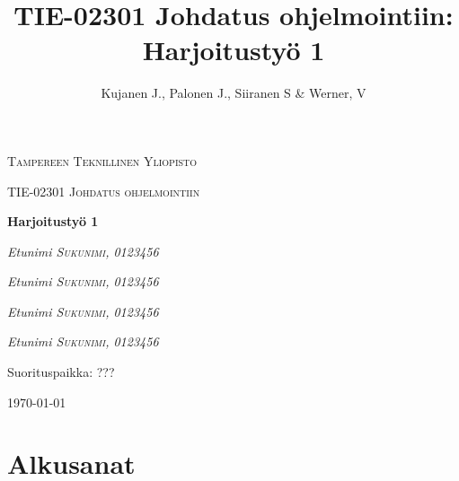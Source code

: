 \documentclass[12pt]{report} %
\title{TIE-02301 Johdatus ohjelmointiin: Harjoitustyö 1}
\author{Kujanen J., Palonen J., Siiranen S \& Werner, V}
\begin{document}

    \begin{titlepage}
        \centering
        {\scshape\LARGE Tampereen Teknillinen Yliopisto \par}
        \vspace{1cm}
        {\scshape\Large TIE-02301 Johdatus ohjelmointiin\par}
        \vspace{2.5cm}
        {\huge\bfseries Harjoitustyö 1 \par}
        \vspace{4cm}
        {\Large\itshape Etunimi \textsc{Sukunimi}, \textit{0123456}\par}
        {\Large\itshape Etunimi \textsc{Sukunimi}, \textit{0123456}\par}
        {\Large\itshape Etunimi \textsc{Sukunimi}, \textit{0123456}\par}
        {\Large\itshape Etunimi \textsc{Sukunimi}, \textit{0123456}\par}
        
        \vfill
        Suorituspaikka: \textsc{???}
    
        \vfill
    
        {\large \today \par}
    \end{titlepage}

    
    \setcounter{page}{1}                    %
    


    {
        \hypersetup{linkcolor=black}
        \tableofcontents  %
    
    }
    


    
    \chapter*{Alkusanat}
    
\end{document}
